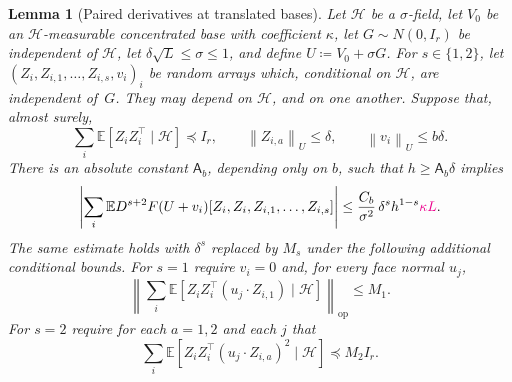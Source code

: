 \documentclass[11pt,letterpaper]{article}
\newcommand{\vSix}[1]{{\color{magenta}#1}}
\newtheorem{lemma}{Lemma}
\theoremstyle{remark}
\newcommand{\E}{\mathbb E}
\newcommand{\op}{\mathrm{op}}
\newcommand{\norm}[1]{\left\lVert#1\right\rVert}
\begin{document}
\begin{lemma}[Paired derivatives at translated bases]
\label{appx-an:lem:restoration}
Let \(\mathcal H\) be a \(\sigma\)-field, let \(V_0\) be an
\(\mathcal H\)-measurable concentrated base\vSix{ with coefficient \(\kappa\)}, let \(G\sim N(0,I_r)\) be
independent of \(\mathcal H\), let \(\delta\sqrt L\le\sigma\le1\), and {define}
\(U\coloneqq V_0+\sigma G\). For \(s\in\{1,2\}\), let
\((Z_i,Z_{i,1},\ldots,Z_{i,s},v_i)_i\) be random arrays which, conditional
on \(\mathcal H\), are independent of~\(G\). They may depend on
\(\mathcal H\), and on one another. Suppose that, almost surely,
\begin{equation}
 \sum_i\E[Z_iZ_i^\top\mid\mathcal H]\preceq I_r,
 \qquad \norm{Z_{i,a}}_U\le\delta,
 \qquad \norm{v_i}_U\le b\delta.
 \label{appx-an:conditional-budget}
\end{equation}
There is an absolute constant \(\mathsf A_b\), depending only on \(b\),
such that \(h\ge\mathsf A_b\delta\) implies
\begin{equation}
 \left|\sum_i\E D^{s+2}F(U+v_i)
         [Z_i,Z_i,Z_{i,1},\ldots,Z_{i,s}]\right|
 \le\frac{C_b}{\sigma^2}\,
                 \delta^s h^{1-s}\vSix{\kappa L}.
 \label{appx-an:restoration-bound}
\end{equation}
The same estimate holds with $\delta^s$ replaced by $M_s$ under the following additional conditional bounds. For $s=1$ require $v_i=0$ and, for every face normal $u_j$,
\[
 \left\|\sum_i\E[Z_iZ_i^\top (u_j\cdot Z_{i,1})\mid\mathcal H]\right\|_{\op}\le M_1.
\]
For $s=2$ require for each $a=1,2$ and each $j$ that
\[
 \sum_i\E[Z_iZ_i^\top (u_j\cdot Z_{i,a})^2\mid\mathcal H]\preceq M_2 I_r .
\]
\end{lemma}
\end{document}
